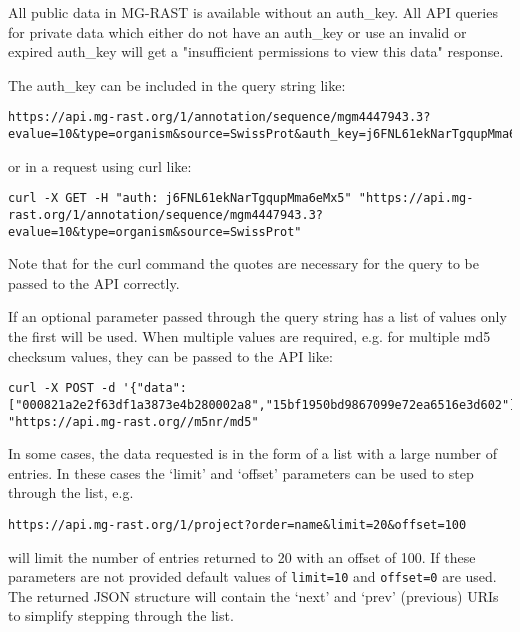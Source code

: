 All public data in MG-RAST is available without an auth\_key. All API queries for private data which either do not have an auth\_key or use an invalid or expired auth\_key will get a "insufficient permissions to view this data" response.

The auth\_key can be included in the query string like:
\begin{small}
\begin{lstlisting}
https://api.mg-rast.org/1/annotation/sequence/mgm4447943.3?evalue=10&type=organism&source=SwissProt&auth_key=j6FNL61ekNarTgqupMma6eMx5
\end{lstlisting}
\end{small} or in a request using curl like:
\begin{small}
\begin{lstlisting}
curl -X GET -H "auth: j6FNL61ekNarTgqupMma6eMx5" "https://api.mg-rast.org/1/annotation/sequence/mgm4447943.3?evalue=10&type=organism&source=SwissProt"
\end{lstlisting}
\end{small} Note that for the curl command the quotes are necessary for the query to be passed to the API correctly.

If an optional parameter passed through the query string has a list of values only the first will be used. When multiple values are required, e.g. for multiple md5 checksum values, they can be passed to the API like:
\begin{small}
\begin{lstlisting}
curl -X POST -d '{"data":["000821a2e2f63df1a3873e4b280002a8","15bf1950bd9867099e72ea6516e3d602"]}' "https://api.mg-rast.org//m5nr/md5"
\end{lstlisting}
\end{small}

In some cases, the data requested is in the form of a list with a large number of entries. In these cases the `limit' and `offset' parameters can be used to step through the list, e.g.
\begin{small}
\begin{lstlisting}
https://api.mg-rast.org/1/project?order=name&limit=20&offset=100
\end{lstlisting}
\end{small} will limit the number of entries returned to 20 with an offset of 100. If these parameters are not provided default values of \texttt{limit=10} and \texttt{offset=0} are used. The returned JSON structure will contain the `next' and `prev' (previous) URIs to simplify stepping through the list.

